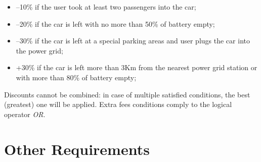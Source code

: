\documentclass{scrreprt}
\begin{document}
\begin{itemize}
		\item --10\% if the user took at least two passengers into the car;
		\item --20\% if the car is left with no more than 50\% of battery empty;
		\item --30\% if the car is left at a special parking areas and user plugs the car into the power grid;
		\item +30\% if the car is left more than 3Km from the nearest power grid station or with more than 80\% of battery empty;
	\end{itemize}

Discounts cannot be combined: in case of multiple satisfied conditions, the best (greatest) one will be applied.
Extra fees conditions comply to the logical operator \emph{OR}.
\begin{comment}$<$List any operating principles about the product, such as which individuals or roles can perform which functions under specific circumstances. These are not functional requirements in themselves, but they may imply certain functional 
requirements to enforce the rules.$>$
\end{comment}


\chapter{Other Requirements}
\begin{comment}$<$Define any other requirements not covered elsewhere in the SRS. This might 
include database requirements, internationalization requirements, legal 
requirements, reuse objectives for the project, and so on. Add any new sections 
that are pertinent to the project.$>$
\end{comment}
\end{document}
